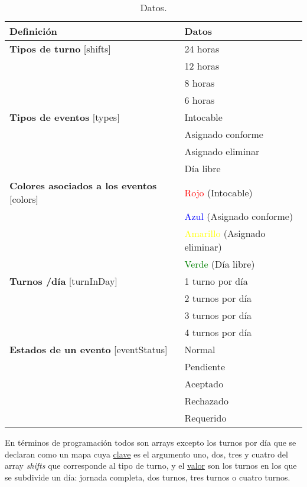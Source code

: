 \begin{itemize}
	\begin{table}[H]
\begin{center}
\begin{tabular}{|l|l|}
\hline
Definición & Datos  \\
\hline \hline
\textbf{Tipos de turno} [shifts] &  24 horas \\ \hline
 &  12 horas \\ \hline
 &  8 horas\\ \hline
 &  6 horas\\ \hline
 \hline \hline
  \textbf{Tipos de eventos}  [types] & Intocable \\ \hline
 &  Asignado conforme \\ \hline
 &  Asignado eliminar \\ \hline
 &  Día libre\\ \hline
 \hline \hline
  \textbf{Colores asociados a los eventos} [colors] & \textcolor{red}{Rojo} \small{(Intocable)} \\ \hline
 &  \textcolor{blue}{Azul} \small{(Asignado conforme)} \\ \hline
 &  \textcolor{yellow}{Amarillo} \small{(Asignado eliminar)} \\ \hline
 &  \textcolor{green}{Verde} \small{(Día libre)} \\ \hline
 \hline \hline
  \textbf{Turnos /día} [turnInDay] & 1 turno por día \\ \hline
 & 2 turnos por día  \\ \hline
 & 3 turnos por día  \\ \hline
 & 4 turnos por día  \\ \hline
 \hline \hline
   \textbf{Estados de un evento} [eventStatus] & Normal \\ \hline
 & Pendiente  \\ \hline
 & Aceptado   \\ \hline
 & Rechazado  \\ \hline
  & Requerido  \\ \hline
\end{tabular}
\caption{Datos.}
\end{center}
\end{table}

En términos de programación todos son arrays excepto los turnos por día que se declaran como un mapa cuya \underline{clave} es el argumento uno, dos, tres y cuatro del array \emph{shifts} que corresponde al tipo de turno, y el \underline{valor} son los turnos en los que se subdivide un día: jornada completa, dos turnos, tres turnos o cuatro turnos.


\end{itemize}
